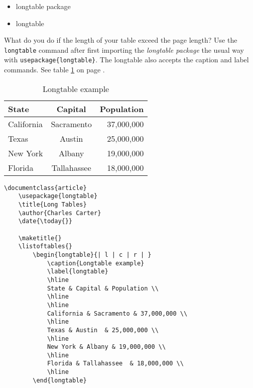         \begin{framed}
            \begin{itemize}
                \item{longtable package}
                \item{longtable}
            \end{itemize}
        \end{framed}

        What do you do if the length of your table exceed the page length? Use the \texttt{longtable} command after first importing the \textit{longtable package} the usual way with \texttt{usepackage\{longtable\}}. The longtable also accepts the caption and label commands. See table \ref{longtable} on page \pageref{longtable}.

        \begin{longtable}{| l | c | r | }
            \caption{Longtable example}
            \label{longtable}
            \hline
            State & Capital & Population \\
            \hline
            \hline
            California & Sacramento & 37,000,000 \\
            \hline
            Texas & Austin  & 25,000,000 \\
            \hline
            New York & Albany & 19,000,000 \\
            \hline
            Florida & Tallahassee  & 18,000,000 \\
            \hline
        \end{longtable}

        \begin{verbatim}
\documentclass{article}
    \usepackage{longtable}
    \title{Long Tables}
    \author{Charles Carter}
    \date{\today{}}
 
    \maketitle{}
    \listoftables{}
        \begin{longtable}{| l | c | r | }
            \caption{Longtable example}
            \label{longtable}
            \hline
            State & Capital & Population \\
            \hline
            \hline
            California & Sacramento & 37,000,000 \\
            \hline
            Texas & Austin  & 25,000,000 \\
            \hline
            New York & Albany & 19,000,000 \\
            \hline
            Florida & Tallahassee  & 18,000,000 \\
            \hline
        \end{longtable}
    


        \end{verbatim}
